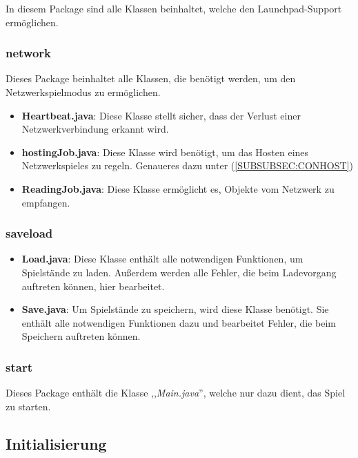 \documentclass[12pt,a4paper]{article}
\begin{document}
In diesem Package sind alle Klassen beinhaltet, welche den Launchpad-Support ermöglichen. 

\subsubsection{network}

Dieses Package beinhaltet alle Klassen, die benötigt werden, um den Netzwerkspielmodus zu ermöglichen.

\begin{itemize}
	\item{\textbf{Heartbeat.java}: Diese Klasse stellt sicher, dass der Verlust einer Netzwerkverbindung erkannt wird.}
	\item{\textbf{hostingJob.java}: Diese Klasse wird benötigt, um das Hosten eines Netzwerkspieles zu regeln. Genaueres dazu unter (\ref{SUBSUBSEC:CONHOST})} %
	\item{\textbf{ReadingJob.java}: Diese Klasse ermöglicht es, Objekte vom Netzwerk zu empfangen. }
\end{itemize}

\subsubsection{saveload}

\begin{itemize}

	\item{\textbf{Load.java}: Diese Klasse enthält alle notwendigen Funktionen, um Spielstände zu laden. Außerdem werden alle Fehler, die beim Ladevorgang auftreten können, hier bearbeitet.  }
	
	\item{\textbf{Save.java}: Um Spielstände zu speichern, wird diese Klasse benötigt. Sie enthält alle notwendigen Funktionen dazu und bearbeitet Fehler, die beim Speichern auftreten können. }


\end{itemize}

\subsubsection{start}

Dieses Package enthält die Klasse ,,\textit{Main.java}'', welche nur dazu dient, das Spiel zu starten.

\newpage
\subsection{Initialisierung}
\label{SUBSEC:INIT}
\end{document}
